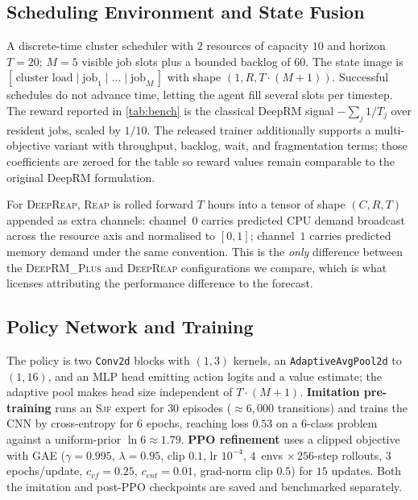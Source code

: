 \documentclass[runningheads]{llncs}
\newcommand{\reap}{\textsc{Reap}}
\newcommand{\deeprm}{\textsc{DeepRM\_Plus}}
\newcommand{\deepreap}{\textsc{DeepReap}}
\newcommand{\sjf}{\textsc{Sjf}}
\begin{document}
\subsection{Scheduling Environment and State Fusion}\label{sec:env}
A discrete-time cluster scheduler with $2$ resources of capacity $10$
and horizon $T{=}20$; $M{=}5$ visible job slots plus a bounded backlog
of $60$. The state image is
$[\,\text{cluster load}\mid\text{job}_1\mid\dots\mid\text{job}_M\,]$
with shape $(1,R,T\cdot(M{+}1))$. Successful schedules do not advance
time, letting the agent fill several slots per timestep. The reward reported in \cref{tab:bench} is the classical DeepRM
signal $-\sum_j 1/T_j$ over resident jobs, scaled by $1/10$. The
released trainer additionally supports a multi-objective variant with
throughput, backlog, wait, and fragmentation terms; those coefficients
are zeroed for the table so reward values remain comparable to the
original DeepRM formulation.

For \deepreap{}, \reap{} is rolled forward $T$ hours into a tensor of
shape $(C,R,T)$ appended as extra channels: channel~$0$ carries
predicted CPU demand broadcast across the resource axis and normalised
to $[0,1]$; channel~$1$ carries predicted memory demand under the same
convention. This is the \emph{only} difference between the \deeprm{}
and \deepreap{} configurations we compare, which is what licenses
attributing the performance difference to the forecast.

\subsection{Policy Network and Training}\label{sec:training}
The policy is two \texttt{Conv2d} blocks with $(1,3)$ kernels, an
\texttt{AdaptiveAvgPool2d} to $(1,16)$, and an MLP head emitting action
logits and a value estimate; the adaptive pool makes head size
independent of $T\cdot(M{+}1)$. \textbf{Imitation pre-training} runs an
\sjf{} expert for $30$ episodes ($\approx6{,}000$ transitions) and
trains the CNN by cross-entropy for $6$ epochs, reaching loss $0.53$ on
a $6$-class problem against a uniform-prior $\ln 6\approx1.79$.
\textbf{PPO refinement} uses a clipped objective with GAE
($\gamma{=}0.995$, $\lambda{=}0.95$, clip $0.1$, lr $10^{-4}$,
$4$~envs $\times\,256$-step rollouts, $3$ epochs/update,
$c_{vf}{=}0.25$, $c_{ent}{=}0.01$, grad-norm clip $0.5$) for $15$
updates. Both the imitation and post-PPO checkpoints are saved and
benchmarked separately.
\end{document}
